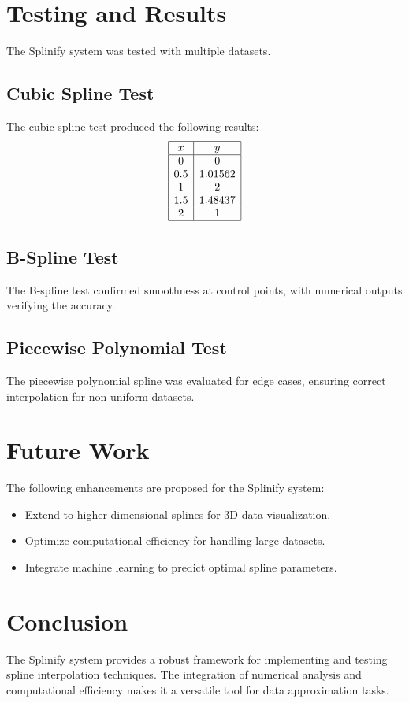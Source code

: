 \documentclass[10pt,a4paper]{article}
\begin{document}
\section{Testing and Results}
The Splinify system was tested with multiple datasets.

\subsection{Cubic Spline Test}
The cubic spline test produced the following results:
\[
\begin{array}{|c|c|}
\hline
x & y \\
\hline
0 & 0 \\
0.5 & 1.01562 \\
1 & 2 \\
1.5 & 1.48437 \\
2 & 1 \\
\hline
\end{array}
\]

\subsection{B-Spline Test}
The B-spline test confirmed smoothness at control points, with numerical outputs verifying the accuracy.

\subsection{Piecewise Polynomial Test}
The piecewise polynomial spline was evaluated for edge cases, ensuring correct interpolation for non-uniform datasets.

\section{Future Work}
The following enhancements are proposed for the Splinify system:
\begin{itemize}
    \item Extend to higher-dimensional splines for 3D data visualization.
    \item Optimize computational efficiency for handling large datasets.
    \item Integrate machine learning to predict optimal spline parameters.
\end{itemize}

\section{Conclusion}
The Splinify system provides a robust framework for implementing and testing spline interpolation techniques. The integration of numerical analysis and computational efficiency makes it a versatile tool for data approximation tasks.



\end{document}
